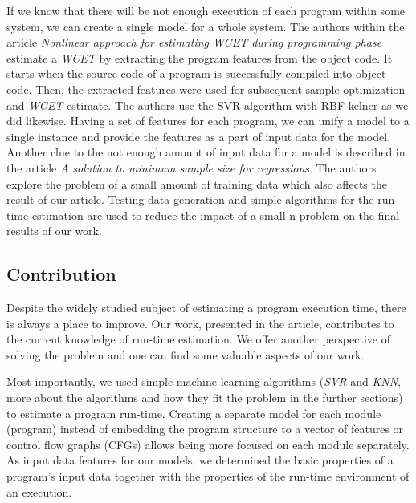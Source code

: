If we know that there will be not enough execution of each program within some system, we can create a single model for a whole system. The authors within the article \textit{Nonlinear approach for estimating WCET during programming phase}\cite{program-features} estimate a \textit{WCET} by extracting the program features from the object code. It starts when the source code of a program is successfully compiled into object code. Then, the extracted features were used for subsequent sample optimization and \textit{WCET} estimate. The authors use the SVR algorithm with RBF kelner as we did likewise. Having a set of features for each program, we can unify a model to a single instance and provide the features as a part of input data for the model. Another clue to the not enough amount of input data for a model is described in the article \textit{A solution to minimum sample size for regressions}\cite{small-n}. The authors explore the problem of a small amount of training data which also affects the result of our article. Testing data generation and simple algorithms for the run-time estimation are used to reduce the impact of a small n problem on the final results of our work.

\subsection{Contribution}

Despite the widely studied subject of estimating a program execution time, there is always a place to improve. Our work, presented in the article, contributes to the current knowledge of run-time estimation. We offer another perspective of solving the problem and one can find some valuable aspects of our work.

Most importantly, we used simple machine learning algorithms (\textit{SVR} and \textit{KNN}, more about the algorithms and how they fit the problem in the further sections) to estimate a program run-time. Creating a separate model for each module (program) instead of embedding the program structure to a vector of features or control flow graphs (CFGs) allows being more focused on each module separately. As input data features for our models, we determined the basic properties of a program’s input data together with the properties of the run-time environment of an execution. 


